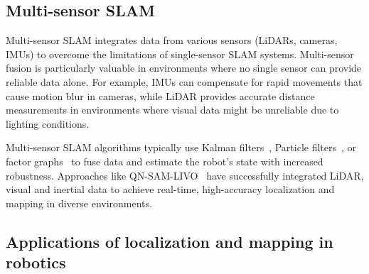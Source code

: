 \subsection{Multi-sensor SLAM}

Multi-sensor SLAM integrates data from various sensors (LiDARs, cameras, IMUs) to overcome the limitations of single-sensor SLAM systems. Multi-sensor fusion is particularly valuable in environments where no single sensor can provide reliable data alone. For example, IMUs can compensate for rapid movements that cause motion blur in cameras, while LiDAR provides accurate distance measurements in environments where visual data might be unreliable due to lighting conditions.

Multi-sensor SLAM algorithms typically use Kalman filters~\cite{kalman1960}, Particle filters~\cite{particle_filter}, or factor graphs~\cite{factor_graph} to fuse data and estimate the robot’s state with increased robustness. Approaches like QN-SAM-LIVO~\cite{qn_sam_livo} have successfully integrated LiDAR, visual and inertial data to achieve real-time, high-accuracy localization and mapping in diverse environments.

\subsection{Applications of localization and mapping in robotics}

